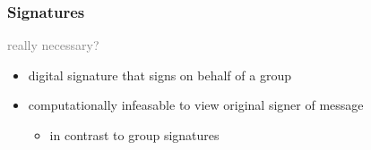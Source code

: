 \begin{frame}
	\frametitle{Signatures}

	\textcolor{gray}{really necessary?}

	\begin{definition}
		\begin{itemize}
			\item digital signature that signs on behalf of a group
			\item computationally infeasable to view original signer of message
				\begin{itemize}
					\item in contrast to group signatures
				\end{itemize}
		\end{itemize}
	\end{definition}
\end{frame}